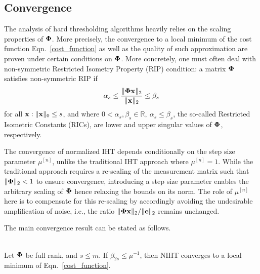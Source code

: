 \documentclass[aoas,preprint]{imsart}
\numberwithin{equation}{section}
\theoremstyle{plain}
\begin{document}

\subsection{Convergence} 
The analysis of hard thresholding algorithms heavily relies on the scaling properties of ${\bf \Phi}$. More precisely, the convergence to a local minimum of the cost function Eqn.~\ref{cost_function} as well as the quality of such approximation are proven under certain conditions on ${\bf \Phi}$. More concretely, one must often deal with non-symmetric Restricted Isometry Property (RIP) condition: a matrix ${\bf \Phi}$ satisfies non-symmetric RIP if
\begin{equation}\label{rip}
\alpha_{s} \leq \frac{\|{\bf \Phi} {\bf x}\|_2}{\|{\bf x}\|_2} \leq \beta_{s}
\end{equation}
for all ${\bf x}: \|{\bf x}\|_0 \leq s$, and where $0<\alpha_s, \beta_s \in \mathbb{R}, \ \alpha_s\leq \beta_s$, the so-called Restricted Isometric Constants (RICs), are lower and upper singular values of ${\bf \Phi}$, respectively.

\begin{remark}\label{remark_noise_amp}
The convergence of normalized IHT depends conditionally on the step size parameter $\mu^{[n]}$, unlike the traditional IHT approach where $\mu^{[n]}=1$.
While the traditional approach requires a re-scaling of the measurement matrix such that $\|{\bf \Phi}\|_2 <1$ to ensure convergence, introducing a step size parameter enables the arbitrary scaling of ${\bf \Phi}$ hence relaxing the bounds on its norm. The role of $\mu^{[n]}$ here is to compensate for this re-scaling by accordingly avoiding the undesirable amplification of noise, i.e., the ratio $\|{\bf \Phi x}\|_2/\|{\bf e}\|_2$ remains unchanged. 
\end{remark}
The main convergence result can be stated as follows.
\begin{theorem}\label{theorem_convergence_IHT}
{\rm{\cite{blumensath2012greedy}}}\\ 
Let ${\bf \Phi}$ be full rank, and $s\leq m$. If $\beta_{2s}\leq\mu^{-1}$, then NIHT converges to a local minimum of Eqn.~\ref{cost_function}.
\end{theorem}
\end{document}

